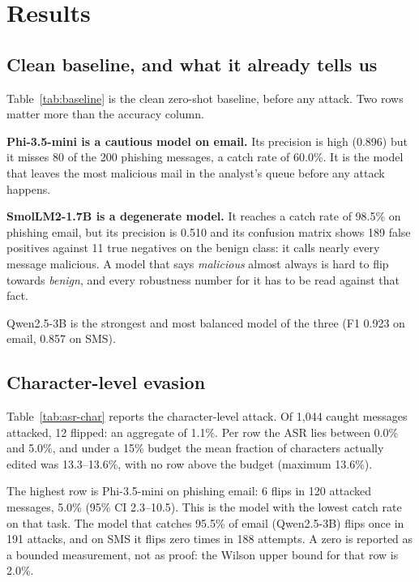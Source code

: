\section{Results}
\label{sec:results}

\subsection{Clean baseline, and what it already tells us}

Table~\ref{tab:baseline} is the clean zero-shot baseline, before any attack. Two
rows matter more than the accuracy column.

\textbf{Phi-3.5-mini is a cautious model on email.} Its precision is high
(0.896) but it misses 80 of the 200 phishing messages, a catch rate of 60.0\%.
It is the model that leaves the most malicious mail in the analyst's queue before
any attack happens.

\textbf{SmolLM2-1.7B is a degenerate model.} It reaches a catch rate of 98.5\%
on phishing email, but its precision is 0.510 and its confusion matrix shows 189
false positives against 11 true negatives on the benign class: it calls nearly
every message malicious. A model that says \emph{malicious} almost always is
hard to flip towards \emph{benign}, and every robustness number for it has to be
read against that fact.

Qwen2.5-3B is the strongest and most balanced model of the three (F1 0.923
on email, 0.857 on SMS).



\subsection{Character-level evasion}

Table~\ref{tab:asr-char} reports the character-level attack. Of 1{,}044 caught
messages attacked, 12 flipped: an aggregate of 1.1\%. Per row the ASR lies
between 0.0\% and 5.0\%, and under a 15\% budget the mean fraction of characters
actually edited was 13.3--13.6\%, with no row above the budget (maximum 13.6\%).

The highest row is Phi-3.5-mini on phishing email: 6 flips in 120 attacked
messages, 5.0\% (95\% CI 2.3--10.5). This is the model with the lowest catch rate
on that task. The model that catches 95.5\% of email (Qwen2.5-3B) flips once in
191 attacks, and on SMS it flips zero times in 188 attempts. A zero is reported
as a bounded measurement, not as proof: the Wilson upper bound for that row is
2.0\%.

